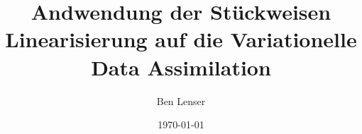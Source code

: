 \documentclass[
	12pt,
	a4paper,
	twoside,
	titlepage,
	parskip=half,
	BCOR=10mm,
	bibliography=totoc,
	headings=normal,
	DIV=calc,
 	draft
]{scrreprt}
\begin{document}
\author{Ben Lenser}
\title{Andwendung der Stückweisen Linearisierung auf die Variationelle Data Assimilation}
\date{\today}

  

\cleardoublepage
{}










\begin{spacing}{1}
 \printbibliography
\end{spacing}

\appendix



\end{document}
